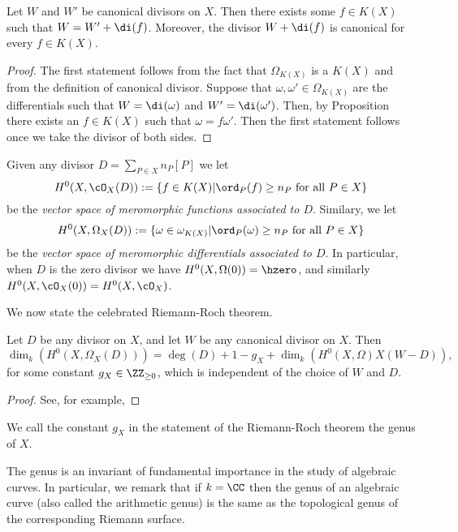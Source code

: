     \begin{thm}
    Let $W$ and $W'$ be canonical divisors on $X$.
    Then there exists some $f \in K(X)$ such that $W = W' + \di(f)$.
    Moreover, the divisor $W + \di(f)$ is canonical for every $f \in K(X)$.
    \end{thm}
    \begin{proof}
    The first statement follows from the fact that $\Omega_{K(X)}$ is a $K(X)$ and from the definition of canonical divisor.
    Suppose that $\omega, \omega' \in \Omega_{K(X)}$ are the differentials such that $W = \di(\omega)$ and $W' = \di(\omega')$.
    Then, by Proposition  there exists an $f \in K(X)$ such that $\omega = f \omega'$.
    Then the first statement follows once we take the divisor of both sides.
    \end{proof}

Given any divisor $D = \sum_{P \in X} n_P[P]$ we let
    \[
    H^0(X,\cO_X(D)) : = \{ f \in K(X) | \ord_P(f) \geq n_P\ \text{for all}\ P \in X\}
    \]
be the \emph{vector space of meromorphic functions associated to $D$}.
Similary, we let 
    \[
    H^0(X,\Omega_X(D)) :  = \{ \omega \in \omega_{K(X)} | \ord_P(\omega) \geq n_P \ \text{for all} \ P \in X\}
    \]
be the \emph{vector space of meromorphic differentials associated to $D$}.
In particular, when $D$ is the zero divisor we have $H^0(X,\Omega(0)) = \hzero$, and similarly $H^0(X,\cO_X(0)) = H^0(X,\cO_X)$.

We now state the celebrated Riemann-Roch theorem.

    \begin{thm}
    Let $D$ be any divisor on $X$, and let $W$ be any canonical divisor on $X$.
    Then
        \[
        \dim_k(H^0(X,\Omega_X(D))) = \deg(D) + 1 - g_X + \dim_k(H^0(X,\Omega)X(W-D)), 
        \]
    for some constant $g_X \in \ZZ_{\geq 0}$, which is independent of the choice of $W$ and $D$.
    \end{thm}
    \begin{proof}
    See, for example, 
    \end{proof}

    \begin{defn}
    We call the constant $g_X$ in the statement of the Riemann-Roch theorem the genus of $X$.
    \end{defn}

The genus is an invariant of fundamental importance in the study of algebraic curves.
In particular, we remark that if $k = \CC$ then the genus of an algebraic curve (also called the arithmetic genus) is the same as the topological genus of the corresponding Riemann surface.

